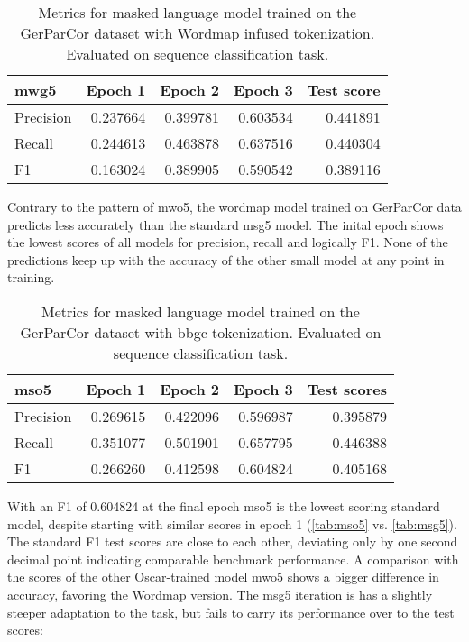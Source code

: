 \begin{table}[H]
    \centering
    \begin{tabular}{lrrrr}
        \toprule
        \textbf{mwg5} & \textbf{Epoch 1} & \textbf{Epoch 2} & \textbf{Epoch 3} & \textbf{Test score} \\
        \midrule
        Precision & 0.237664 & 0.399781 & 0.603534 & 0.441891 \\
        Recall & 0.244613 & 0.463878 & 0.637516 & 0.440304 \\
        F1 & 0.163024 & 0.389905 & 0.590542 & 0.389116 \\
        \bottomrule
    \end{tabular}
    \caption[Metrics for model mwg5]{Metrics for masked language model trained on the GerParCor dataset with Wordmap infused tokenization. Evaluated on sequence classification task.}
    \label{tab:mwg5}
\end{table}

Contrary to the pattern of mwo5, the wordmap model trained on GerParCor data predicts less accurately than the standard msg5 model.
The inital epoch shows the lowest scores of all models for precision, recall and logically F1.
None of the predictions keep up with the accuracy of the other small model at any point in training.

\begin{table}[H]
    \centering
    \begin{tabular}{lrrrr}
        \toprule
        \textbf{mso5} & \textbf{Epoch 1} & \textbf{Epoch 2} & \textbf{Epoch 3} & \textbf{Test scores} \\
        \midrule
        Precision & 0.269615 & 0.422096 & 0.596987 & 0.395879 \\
        Recall & 0.351077 & 0.501901 & 0.657795 & 0.446388 \\
        F1 & 0.266260 & 0.412598 & 0.604824 & 0.405168 \\
        \bottomrule
    \end{tabular}
    \caption[Metrics for model mso5]{Metrics for masked language model trained on the GerParCor dataset with \ac{bbgc} tokenization. Evaluated on sequence classification task.}
    \label{tab:mso5}
\end{table}

With an F1 of 0.604824 at the final epoch mso5 is the lowest scoring standard model, despite starting with similar scores in epoch 1 (\autoref{tab:mso5} vs. \autoref{tab:msg5}).
The standard F1 test scores are close to each other, deviating only by one second decimal point indicating comparable benchmark performance.
A comparison with the scores of the other Oscar-trained model mwo5 shows a bigger difference in accuracy, favoring the Wordmap version.
The msg5 iteration is has a slightly steeper adaptation to the task, but fails to carry its performance over to the test scores:

